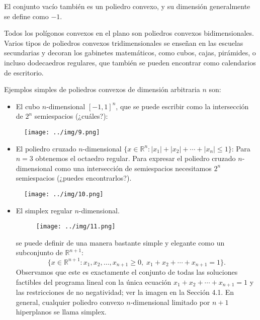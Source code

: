 \documentclass{article}
\begin{document}
El conjunto vacío también es un poliedro convexo, y su dimensión generalmente se define como \(-1\).

Todos los polígonos convexos en el plano son poliedros convexos bidimensionales. Varios tipos de poliedros convexos tridimensionales se enseñan en las escuelas secundarias y decoran los gabinetes matemáticos, como cubos, cajas, pirámides, o incluso dodecaedros regulares, que también se pueden encontrar como calendarios de escritorio.

Ejemplos simples de poliedros convexos de dimensión arbitraria \(n\) son:
\begin{itemize}
    \item El cubo \(n\)-dimensional \([-1, 1]^n\), que se puede escribir como la intersección de \(2^n\) semiespacios (¿cuáles?):
\end{itemize}
\begin{figure}[H] %
\centering %
\texttt{[image: ../img/9.png]} %
\label{fig:imagen} %
\end{figure}
\begin{itemize}
\item El poliedro cruzado \(n\)-dimensional \(\{ x \in \mathbb{R}^n : |x_1| + |x_2| + \cdots + |x_n| \leq 1 \}\):
Para \(n = 3\) obtenemos el octaedro regular. Para expresar el poliedro cruzado \(n\)-dimensional como una intersección de semiespacios necesitamos \(2^n\) semiespacios (¿puedes encontrarlos?).
\end{itemize}

\begin{figure}[H] %
\centering %
\texttt{[image: ../img/10.png]} %
\label{fig:imagen} %
\end{figure}

\begin{itemize}
\item El simplex regular \(n\)-dimensional.

\begin{figure}[H] %
\centering %
\texttt{[image: ../img/11.png]} %
\label{fig:imagen} %
\end{figure}

se puede definir de una manera bastante simple y elegante como un subconjunto de \(\mathbb{R}^{n+1}\):
\[
\{ x \in \mathbb{R}^{n+1} : x_1, x_2, \ldots, x_{n+1} \geq 0, \; x_1 + x_2 + \cdots + x_{n+1} = 1 \}.
\]
Observamos que este es exactamente el conjunto de todas las soluciones factibles del programa lineal con la única ecuación \(x_1 + x_2 + \cdots + x_{n+1} = 1\) y las restricciones de no negatividad; ver la imagen en la Sección 4.1. En general, cualquier poliedro convexo \(n\)-dimensional limitado por \(n+1\) hiperplanos se llama simplex.
\end{itemize}
\end{document}
